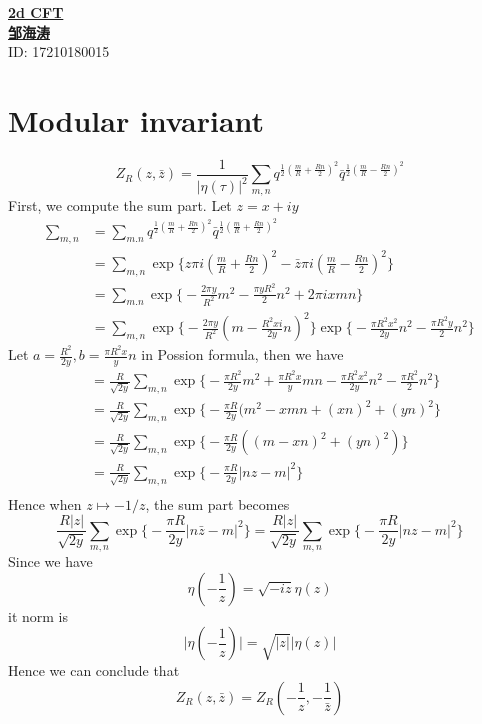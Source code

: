 \newpage
\noindent
{\LARGE\underline{\textbf{2d CFT}}}\\
{\hfill\large  \underline{\textbf{邹海涛}} \\
	\hfill ID: 17210180015}\\
\section{Modular invariant}
\[
Z_R(z, \bar{z}) = \frac{1}{\lvert \eta (\tau) \rvert ^2} \sum_{m,n} q^{\frac{1}{2}(\frac{m}{R}+ \frac{Rn}{2})^2} \bar{q}^{\frac{1}{2} (\frac{m}{R} - \frac{Rn}{2})^2}
\]
First, we compute the sum part. Let $z= x+ iy$
\[
\begin{aligned}
\sum_{m,n}&= \sum_{m.n}q^{\frac{1}{2} ( \frac{m}{R}+ \frac{Rn}{2})^2} \bar{q}^{\frac{1}{2}(\frac{m}{R}+ \frac{Rn}{2})^2}\\
&= \sum_{m,n}\exp\big\{z \pi i (\frac{m}{R}+ \frac{Rn}{2})^2 -\bar{z} \pi i (\frac{m}{R}- \frac{Rn}{2})^2 \big\}\\
&= \sum_{m.n} \exp\big\{-\frac{2\pi y}{R^2}m^2 - \frac{\pi y R^2}{2}n^2 + 2\pi i xmn \big\}\\
&= \sum_{m,n} \exp\big\{- \frac{2\pi y}{R^2} (m - \frac{R^2x i}{2y}n )^2\big\} \exp \big\{-\frac{\pi R^2 x^2 }{2y} n^2 - \frac{\pi R^2 y}{2}n^2\big\}
\end{aligned}
\]
Let $ a= \frac{R^2}{2y}, b = \frac{\pi R^2 x}{y}n$ in Possion formula, then we have 
\[
\begin{aligned}
&= \frac{R}{\sqrt{2y}} \sum_{m,n}\exp \big\{-\frac{\pi R^2}{2y} m^2 + \frac{\pi R^2 x}{y}mn - \frac{\pi R^2 x^2}{2y}n^2 -\frac{\pi R^2}{2} n^2\big\}\\
&= \frac{R}{\sqrt{2y}}\sum_{m,n} \exp\big\{- \frac{\pi R}{2y}( m^2 - xmn + (xn)^2+(yn)^2\big\}\\
& = \frac{R}{\sqrt{2y}} \sum_{m,n}\exp\big\{- \frac{\pi R}{2y}( (m-xn)^2+ (yn)^2)\big\}\\
& = \frac{R}{\sqrt{2y}} \sum_{m,n}\exp\big\{- \frac{\pi R}{2y}\lvert n z -m \rvert ^2\big\}\\
\end{aligned}
\]
Hence when $z \mapsto -1/z$, the sum part becomes
\[
\frac{R\lvert z\rvert}{\sqrt{2y}} \sum_{m,n}\exp\big\{- \frac{\pi R}{2y}\lvert n \bar{z} -m \rvert ^2\big\}= \frac{R\lvert z\rvert}{\sqrt{2y}} \sum_{m,n}\exp\big\{- \frac{\pi R}{2y}\lvert n z -m \rvert ^2\big\}
\]
Since we have
\[
\eta(- \frac{1}{z})= \sqrt{-iz} \eta(z)
\]
it norm is 
\[
\lvert \eta(- \frac{1}{z}) \rvert = \sqrt{\lvert z \rvert} \lvert \eta(z) \rvert
\]
Hence we can conclude that
\[
Z_R(z, \bar{z}) =Z_R(- \frac{1}{z}, -\frac{1}{\bar{z}})
\]
